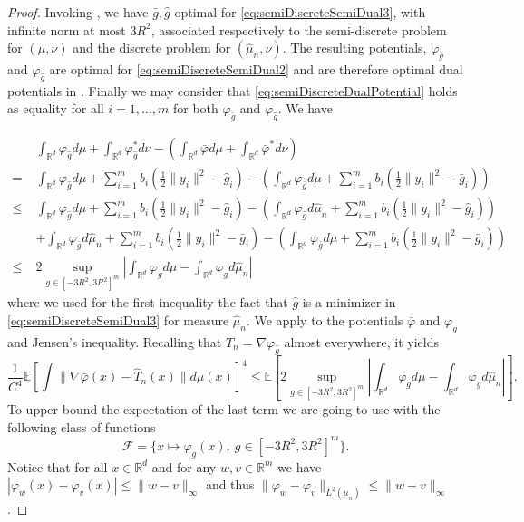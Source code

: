 \documentclass[11pt]{article}
\newcommand{\R}{\mathbb R}
\newcommand{\1}{\mathbbm{1}}
\numberwithin{equation}{section}
\begin{document}
\begin{proof}
    Invoking , we have $\bar{g}, \hat{g}$ optimal for \eqref{eq:semiDiscreteSemiDual3}, with infinite norm at most $3R^2$, associated respectively to the semi-discrete problem for $(\mu,\nu)$ and the discrete problem for $(\hat{\mu}_n,\nu)$. The resulting potentials, $\varphi_{\bar{g}}$ and $\varphi_{\hat{g}}$ are optimal for \eqref{eq:semiDiscreteSemiDual2} and are therefore optimal dual potentials in . Finally we may consider that \eqref{eq:semiDiscreteDualPotential} holds as equality for all $i = 1, \ldots, m$ for both $\varphi_{\bar{g}}$ and $\varphi_{\hat{g}}$. We have
    

    \begin{align*}      &\int_{\R^d}\varphi_{\hat{g}}d\mu+\int_{\R^d}\varphi_{\hat{g}}^*d\nu-\left(\int_{\R^d} \bar{\varphi}d\mu +\int_{\R^d}\bar{\varphi}^*d\nu\right)\\
        =\;&\int_{\R^d} \varphi_{\hat{g}} d\mu +\sum_{i=1}^m b_i\left( \frac{1}{2}\|y_i\|^2-\hat{g}_i  \right)-\left(\int_{\R^d} \varphi_{\bar{g}} d\mu + \sum_{i=1}^m b_i\left( \frac{1}{2}\|y_i\|^2-\bar{g}_i  \right)\right)\\
        \leq\;& \int_{\R^d} \varphi_{\hat{g}} d\mu +\sum_{i=1}^m b_i\left( \frac{1}{2}\|y_i\|^2-\hat{g}_i  \right)-\left(\int_{\R^d} \varphi_{\hat{g}} d\hat{\mu}_n +\sum_{i=1}^m b_i\left( \frac{1}{2}\|y_i\|^2-\hat{g}_i  \right)\right)\\
        &+\int_{\R^d} \varphi_{\bar{g}} d\hat{\mu}_n +\sum_{i=1}^m b_i\left( \frac{1}{2}\|y_i\|^2-\bar{g}_i  \right)-\left(\int_{\R^d} \varphi_{\bar{g}} d\mu +\sum_{i=1}^m b_i\left( \frac{1}{2}\|y_i\|^2-\bar{g}_i\right)  \right)\\
        \leq\;& 2\sup_{g \in [-3R^2,3R^2]^m }\left| \int_{\R^d} \varphi_{g}d\mu -\int_{\R^d}\varphi_g d\hat{\mu}_n \right|
    \end{align*}
    where we used for the first inequality the fact that $\hat{g}$ is a minimizer in \eqref{eq:semiDiscreteSemiDual3} for measure $\hat{\mu}_n$.   We apply   to the potentials $\bar{\varphi}$ and $\varphi_{\hat{g}}$ and Jensen's inequality. Recalling that $\hat{T}_n=\nabla \varphi_{\hat{g}}$ almost everywhere, it yields
    \begin{equation}
        \frac{1}{C^4}\mathbb{E}\left[\int \|\nabla \bar{\varphi}(x)-\hat{T}_n(x) \|d\mu(x) \right] ^4\leq\mathbb{E}\left[2\sup_{g\in [-3R^2,3R^2]^m }\left| \int_{\R^d} \varphi_{g}d\mu -\int_{\R^d}\varphi_g d\hat{\mu}_n\right| \right].
        \label{eq:proof_semi-discrete_stat_thm}
    \end{equation}
    To upper bound the expectation of the last term we are going to use \cite[Theorem 3.5.1]{gine2021mathematical} with the following class of functions
    \begin{equation*}
        \mathcal{F}=\{x\mapsto\varphi_g(x),\:g\in \left[-3R^2,3R^2\right]^m\}.
    \end{equation*}
    Notice that for all $x\in\R^d$ and for any $w,v\in \R^m$ we have $|\varphi_w(x)-\varphi_v(x)|\leq \|w-v\|_\infty$ and thus $\|\varphi_w-\varphi_v\|_{L^2(\mu_n)}  \leq \|w-v\|_\infty$. 
    

\end{proof}
\end{document}
